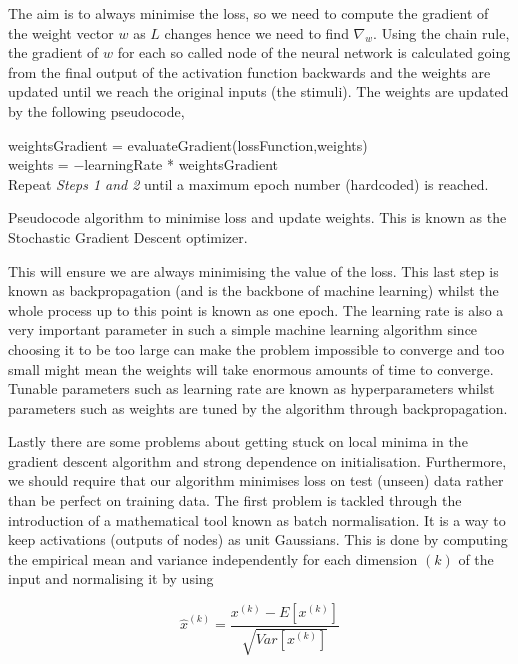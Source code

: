 \documentclass[11pt]{article} %
\begin{document}
The aim is to always minimise the loss, so we need to compute the gradient of the weight vector $w$ as $L$ changes hence we need to find ${\nabla_w}$. Using the chain rule, the gradient of $w$ for each so called node of the neural network is calculated going from the final output of the activation function backwards and the weights are updated until we reach the original inputs (the stimuli). The weights are updated by the following pseudocode,
\begin{algorithm}
weightsGradient = evaluateGradient(lossFunction,weights)\\
weights = $-$learningRate * weightsGradient\\
Repeat \textit{Steps 1 and 2} until a maximum epoch number (hardcoded) is reached.
\caption{Pseudocode algorithm to minimise loss and update weights. This is known as the Stochastic Gradient Descent optimizer.}
\label{algo:minLoss}
\end{algorithm}
\newline
This will ensure we are always minimising the value of the loss. This last step is known as backpropagation (and is the backbone of machine learning) whilst the whole process up to this point is known as one epoch. The learning rate is also a very important parameter in such a simple machine learning algorithm since choosing it to be too large can make the problem impossible to converge and too small might mean the weights will take enormous amounts of time to converge. Tunable parameters such as learning rate are known as hyperparameters whilst parameters such as weights are tuned by the algorithm through backpropagation.
\newline

Lastly there are some problems about getting stuck on local minima in the gradient descent algorithm and strong dependence on initialisation. Furthermore, we should require that our algorithm minimises loss on test (unseen) data rather than be perfect on training data. The first problem is tackled through the introduction of a mathematical tool known as batch normalisation. It is a way to keep activations (outputs of nodes) as unit Gaussians. This is done by computing the empirical mean and variance
independently for each dimension $(k)$ of the input and normalising it by using

\begin{equation}
\hat{x}^{(k)} = \frac{{x^{(k)}}-E[{x^{(k)}}]}{\sqrt{Var[{x^{(k)}}]}}
\end{equation}
\end{document}
